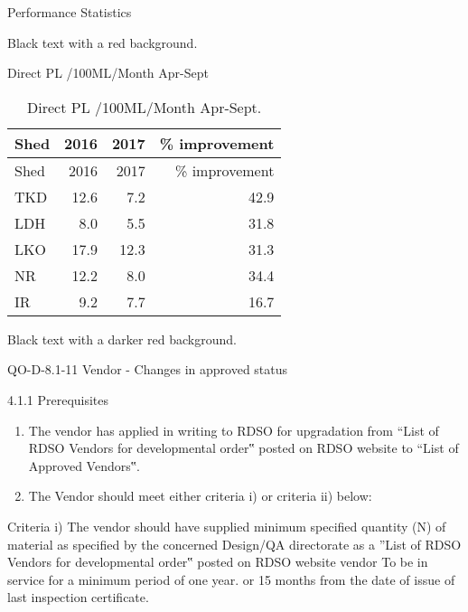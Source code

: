 \documentclass[
  ignorenonframetext,
]{beamer}
\begin{document}
\begin{frame}{Performance Statistics}
\protect\hypertarget{performance-statistics}{}
\begin{shaded}
Black text with a red background.
\end{shaded}


\begin{block}{Direct PL /100ML/Month Apr-Sept}
\protect\hypertarget{direct-pl-100mlmonth-apr-sept}{}
\begin{longtable}[]{@{}lrrr@{}}
\caption{Direct PL /100ML/Month Apr-Sept.}\tabularnewline
\toprule
Shed & 2016 & 2017 & \% improvement \\
\midrule
\endfirsthead
\toprule
Shed & 2016 & 2017 & \% improvement \\
\midrule
\endhead
TKD & 12.6 & 7.2 & 42.9 \\
LDH & 8.0 & 5.5 & 31.8 \\
LKO & 17.9 & 12.3 & 31.3 \\
NR & 12.2 & 8.0 & 34.4 \\
IR & 9.2 & 7.7 & 16.7 \\
\bottomrule
\end{longtable}


\begin{shaded}

Black text with a darker red background.

\end{shaded}

QO-D-8.1-11 Vendor - Changes in approved status

4.1.1 Prerequisites

\begin{enumerate}[<+->]
[a)]
\item
  The vendor has applied in writing to RDSO for upgradation from ``List
  of RDSO Vendors for developmental order‟ posted on RDSO website to
  ``List of Approved Vendors‟.
\item
  The Vendor should meet either criteria i) or criteria ii) below:
\end{enumerate}

Criteria i) The vendor should have supplied minimum specified quantity
(N) of material as specified by the concerned Design/QA directorate as a
''List of RDSO Vendors for developmental order‟ posted on RDSO website
vendor To be in service for a minimum period of one year. or 15 months
from the date of issue of last inspection certificate.


\end{block}
\end{frame}
\end{document}

